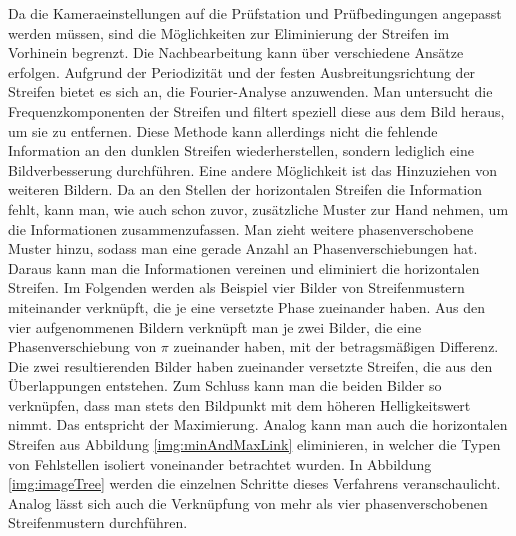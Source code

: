 Da die Kameraeinstellungen auf die Prüfstation und Prüfbedingungen angepasst werden müssen, sind die Möglichkeiten zur Eliminierung der Streifen im Vorhinein begrenzt.
Die Nachbearbeitung kann über verschiedene Ansätze erfolgen.
Aufgrund der Periodizität und der festen Ausbreitungsrichtung der Streifen bietet es sich an, die Fourier-Analyse anzuwenden.
Man untersucht die Frequenzkomponenten der Streifen und filtert speziell diese aus dem Bild heraus, um sie zu entfernen.
Diese Methode kann allerdings nicht die fehlende Information an den dunklen Streifen wiederherstellen, sondern lediglich eine Bildverbesserung durchführen.
Eine andere Möglichkeit ist das Hinzuziehen von weiteren Bildern.
Da an den Stellen der horizontalen Streifen die Information fehlt, kann man, wie auch schon zuvor, zusätzliche Muster zur Hand nehmen, um die Informationen zusammenzufassen.
Man zieht weitere phasenverschobene Muster hinzu, sodass man eine gerade Anzahl an Phasenverschiebungen hat.
Daraus kann man die Informationen vereinen und eliminiert die horizontalen Streifen.
Im Folgenden werden als Beispiel vier Bilder von Streifenmustern miteinander verknüpft, die je eine versetzte Phase zueinander haben.
Aus den vier aufgenommenen Bildern verknüpft man je zwei Bilder, die eine Phasenverschiebung von $\pi$ zueinander haben, mit der betragsmäßigen Differenz.
Die zwei resultierenden Bilder haben zueinander versetzte Streifen, die aus den Überlappungen entstehen.
Zum Schluss kann man die beiden Bilder so verknüpfen, dass man stets den Bildpunkt mit dem höheren Helligkeitswert nimmt.
Das entspricht der Maximierung.
Analog kann man auch die horizontalen Streifen aus Abbildung \ref{img:minAndMaxLink} eliminieren, in welcher die Typen von Fehlstellen isoliert voneinander betrachtet wurden.
In Abbildung \ref{img:imageTree} werden die einzelnen Schritte dieses Verfahrens veranschaulicht.
Analog lässt sich auch die Verknüpfung von mehr als vier phasenverschobenen Streifenmustern durchführen.

